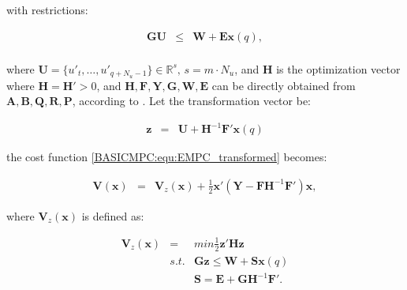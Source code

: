 		with restrictions:
		
		\begin{equation}
        \begin{array}{rcl}
				\textbf{GU}&\leq& \textbf{W}+\textbf{Ex}(q),\\
        \end{array}
        \label{BASICMPC:equ:EMPC_transformed_2}
    \end{equation}
		
		where $\textbf{U}=\{u'_t,\dots,u'_{q+N_u-1}\}\in\mathbb{R}^s,\,s=m\cdot N_u$, and $\textbf{H}$ is the optimization vector where $\textbf{H}=\textbf{H}'>0$, and $\textbf{H},\textbf{F},\textbf{Y},\textbf{G},\textbf{W},\textbf{E}$ can be directly obtained from $\textbf{A},\textbf{B},\textbf{Q},\textbf{R},\textbf{P}$, according to \cite{borrelli2017predictive}. Let the transformation vector be:
		
		\begin{equation}
        \begin{array}{rcl}
				\textbf{z}&=&\textbf{U}+\textbf{H}^{-1}\textbf{F}'\textbf{x}(q)
        \end{array}
        \label{BASICMPC:equ:EMPC_trans_var}
    \end{equation}
		
		the cost function \ref{BASICMPC:equ:EMPC_transformed} becomes:
		
		\begin{equation}
        \begin{array}{rcl}
				\textbf{V}(\textbf{x})&=&\textbf{V}_z(\textbf{x})+\frac{1}{2}\textbf{x}'\left(\textbf{Y}-\textbf{FH}^{-1}\textbf{F}'\right)\textbf{x},
        \end{array}
        \label{BASICMPC:equ:EMPC_trans_var}
    \end{equation}
		
		where $\textbf{V}_z(\textbf{x})$ is defined as:
		
		\begin{equation}
        \begin{array}{rcl}
				\textbf{V}_z(\textbf{x})&=&min\frac{1}{2}\textbf{z}'\textbf{Hz}\\
				&s.t.&\textbf{Gz}\leq \textbf{W}+\textbf{Sx}(q)\\
				&&\textbf{S}=\textbf{E}+\textbf{GH}^{-1}\textbf{F}'.\\
        \end{array}
        \label{BASICMPC:equ:EMPC_transformed}
    \end{equation}
		
